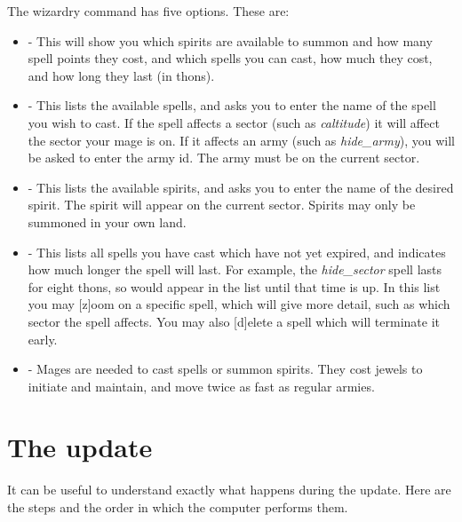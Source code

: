 The wizardry command has five options.  These are:
\begin{itemize}
\item
{} - This will show you which spirits are
available to summon and how many spell points they cost, and which
spells you can cast, how much they cost, and how long they last (in
thons).
\item
{} - This lists the available spells, and asks you
to enter the name of the spell you wish to cast.  If the spell affects
a sector (such as {\em caltitude}) it will affect the sector your mage
is on.  If it affects an army (such as {\em hide_army}), you will be
asked to enter the army id.  The army must be on the current sector.
\item
{} - This lists the available spirits, and asks you to
enter the name of the desired spirit.  The spirit will appear on the
current sector.  Spirits may only be summoned in your own land.
\item
{} - This lists all spells you have cast which have not
yet expired, and indicates how much longer the spell will last. For
example, the {\em hide_sector} spell lasts for eight thons, so would
appear in the list until that time is up.  In this list you may [z]oom
on a specific spell, which will give more detail, such as which sector
the spell affects.  You may also [d]elete a spell which will terminate
it early.
\item
{} - Mages are needed to cast spells or summon spirits.
They cost jewels to initiate and maintain, and move twice as fast as
regular armies.
\end{itemize}

\chapter{The update}

It can be useful to understand exactly what happens during the update.
Here are the steps and the order in which the computer performs them.

